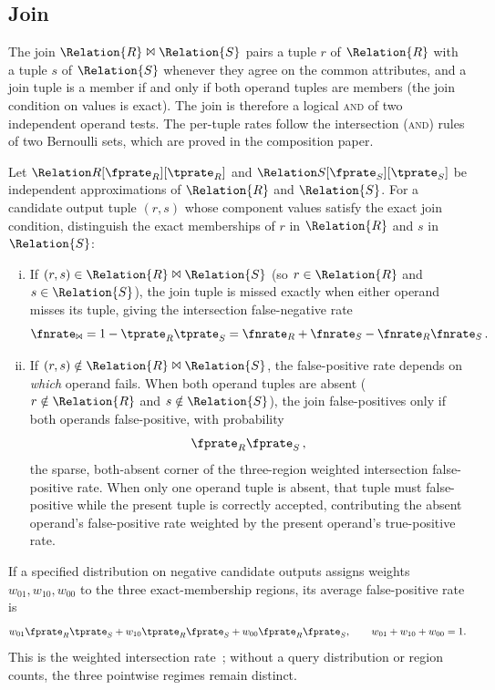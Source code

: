 \documentclass[ ../main.tex]{subfiles}
\begin{document}
\subsection{Join}
\label{sec:join}
The join $\Relation{R} \Join \Relation{S}$ pairs a tuple $r$ of $\Relation{R}$
with a tuple $s$ of $\Relation{S}$ whenever they agree on the common attributes,
and a join tuple is a member if and only if both operand tuples are members
(the join condition on values is exact). The join is therefore a logical
\textsc{and} of two independent operand tests. The per-tuple rates follow the
intersection (\textsc{and}) rules of two Bernoulli sets, which are proved in the
composition paper.

\begin{theorem}
\label{thm:join}
Let $\ARelation{R}[\fprate_R][\tprate_R]$ and
$\ARelation{S}[\fprate_S][\tprate_S]$ be independent approximations of
$\Relation{R}$ and $\Relation{S}$. For a candidate output tuple $(r,s)$ whose
component values satisfy the exact join condition, distinguish the exact
memberships of $r$ in $\Relation{R}$ and $s$ in $\Relation{S}$:
\begin{enumerate}[(i)]
    \item If $(r,s) \in \Relation{R} \Join \Relation{S}$ (so $r \in \Relation{R}$
    and $s \in \Relation{S}$), the join tuple is missed exactly when either
    operand misses its tuple, giving the intersection false-negative rate
    \begin{equation}
        \fnrate_\Join = 1 - \tprate_R \tprate_S
                      = \fnrate_R + \fnrate_S - \fnrate_R \fnrate_S\,.
    \end{equation}
    \item If $(r,s) \notin \Relation{R} \Join \Relation{S}$, the false-positive
    rate depends on \emph{which} operand fails. When both operand tuples are
    absent ($r \notin \Relation{R}$ and $s \notin \Relation{S}$), the join
    false-positives only if both operands false-positive, with probability
    \begin{equation}
        \fprate_R \fprate_S\,,
    \end{equation}
    the sparse, both-absent corner of the three-region weighted intersection
    false-positive rate. When only one operand tuple is absent, that tuple must
    false-positive while the present tuple is correctly accepted, contributing the
    absent operand's false-positive rate weighted by the present operand's
    true-positive rate.
\end{enumerate}
If a specified distribution on negative candidate outputs assigns weights
$w_{01},w_{10},w_{00}$ to the three exact-membership regions, its average
false-positive rate is
\begin{equation}
 w_{01}\fprate_R\tprate_S+
 w_{10}\tprate_R\fprate_S+
 w_{00}\fprate_R\fprate_S,\qquad
 w_{01}+w_{10}+w_{00}=1.
\end{equation}
This is the weighted intersection rate~\cite{bernoulliComposition}; without a
query distribution or region counts, the three pointwise regimes remain
distinct.
\end{theorem}
\end{document}

